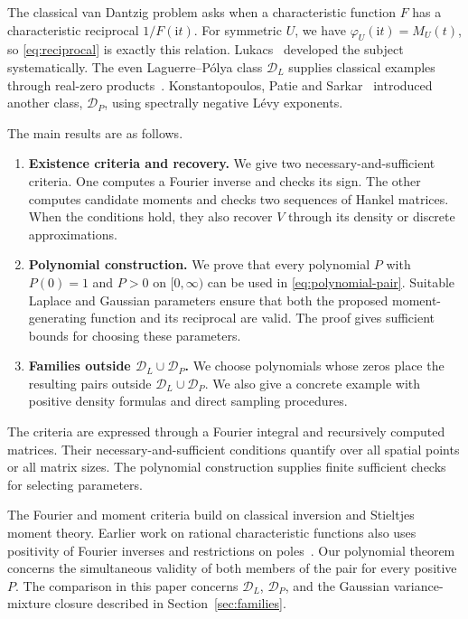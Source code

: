 \documentclass[11pt,twoside]{article}
\theoremstyle{journalplain}
\numberwithin{equation}{section}
\theoremstyle{journaldefinition}
\newcommand{\DL}{\mathcal D_L}
\newcommand{\DP}{\mathcal D_P}
\newcommand{\ii}{\mathrm i}
\begin{document}
The classical van Dantzig problem asks when a characteristic function $F$ has a characteristic reciprocal $1/F(\ii t)$. For symmetric $U$, we have $\varphi_U(\ii t)=M_U(t)$, so \eqref{eq:reciprocal} is exactly this relation. Lukacs\ \cite{Lukacs1968} developed the subject systematically. The even Laguerre--P\'olya class $\DL$ supplies classical examples through real-zero products\ \cite{Schoenberg1951}. Konstantopoulos, Patie and Sarkar\ \cite{KPS2024} introduced another class, $\DP$, using spectrally negative L\'evy exponents.

The main results are as follows.
\begin{enumerate}[label=(\roman*)]
\item \textbf{Existence criteria and recovery.} We give two necessary-and-sufficient criteria. One computes a Fourier inverse and checks its sign. The other computes candidate moments and checks two sequences of Hankel matrices. When the conditions hold, they also recover $V$ through its density or discrete approximations.
\item \textbf{Polynomial construction.} We prove that every polynomial $P$ with $P(0)=1$ and $P>0$ on $[0,\infty)$ can be used in \eqref{eq:polynomial-pair}. Suitable Laplace and Gaussian parameters ensure that both the proposed moment-generating function and its reciprocal are valid. The proof gives sufficient bounds for choosing these parameters.
\item \textbf{Families outside $\DL\cup\DP$.} We choose polynomials whose zeros place the resulting pairs outside $\DL\cup\DP$. We also give a concrete example with positive density formulas and direct sampling procedures.
\end{enumerate}
The criteria are expressed through a Fourier integral and recursively computed matrices. Their necessary-and-sufficient conditions quantify over all spatial points or all matrix sizes. The polynomial construction supplies finite sufficient checks for selecting parameters.

The Fourier and moment criteria build on classical inversion and Stieltjes moment theory. Earlier work on rational characteristic functions also uses positivity of Fourier inverses and restrictions on poles\ \cite{LukacsSzasz1954,LukacsSzasz1954II}. Our polynomial theorem concerns the simultaneous validity of both members of the pair for every positive $P$. The comparison in this paper concerns $\DL$, $\DP$, and the Gaussian variance-mixture closure described in Section~\ref{sec:families}.
\end{document}
